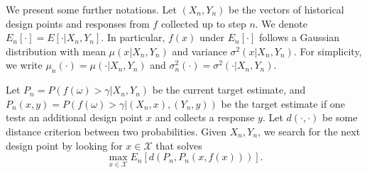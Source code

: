 \documentclass{wscpaperproc}
\theoremstyle{wsc}
\begin{document}
We present some further notations. Let $(X_n,Y_n)$ be the vectors of historical design points and responses from $f$ collected up to step $n$. We denote $E_n[\cdot]=E[\cdot|X_n,Y_n]$. In particular, $f(x)$ under $E_n[\cdot]$ follows a Gaussian distribution with mean $\mu(x|X_n,Y_n)$ and variance $\sigma^2(x|X_n,Y_n)$. For simplicity, we write $\mu_n(\cdot)=\mu(\cdot|X_n,Y_n)$ and $\sigma^2_n(\cdot)=\sigma^2(\cdot|X_n,Y_n)$.


Let $P_n=P(f(\omega)>\gamma|X_n,Y_n)$ be the current target estimate, and $P_n(x,y)=P(f(\omega)>\gamma|(X_n,x),(Y_n,y))$ be the target estimate if one tests an additional design point $x$ and collects a response $y$. Let $d(\cdot,\cdot)$ be some distance criterion between two probabilities. Given $X_n,Y_n$, we search for the next design point by looking for $x\in\mathcal X$ that solves
\begin{equation}
	\max_{x \in \mathcal{X}} E_n \left[ d(P_n,P_n(x,f(x)))  \right].
    \label{obj}
\end{equation}
\end{document}
